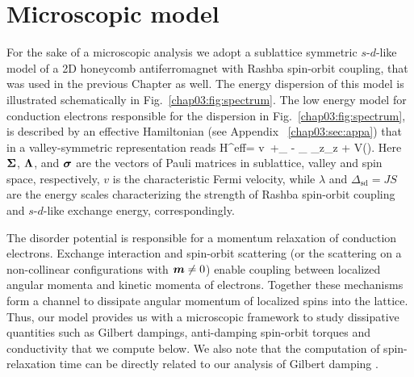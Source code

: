 \section{Microscopic model}

For the sake of a microscopic analysis we adopt a sublattice symmetric $s$-$d$-like model of a 2D honeycomb antiferromagnet with Rashba spin-orbit coupling, that was used in the previous Chapter as well. The energy dispersion of this model is illustrated schematically in Fig.~\ref{chap03:fig:spectrum}.  
The low energy model for conduction electrons responsible for the dispersion in Fig.~\ref{chap03:fig:spectrum}, is described by an effective Hamiltonian (see Appendix ~\ref{chap03:sec:appa}) that in a valley-symmetric representation reads
\be
\label{chap03:eff}
H^\textrm{eff}= v\, \cdot\bb{\Sigma}+\lambda\lt[\bb{\sigma}\times\bb{\Sigma}\rt]_{} - \Delta_{}\,\cdot\bb{\sigma}\,\Sigma_z\Lambda_z + V().
\e
Here $\boldsymbol{\Sigma}$, $\boldsymbol{\Lambda}$, and $\boldsymbol{\sigma}$ are the vectors of Pauli matrices in sublattice, valley and spin space, respectively, $v$ is the characteristic Fermi velocity, while $\lambda$ and $\Delta_{\text{sd}}=JS$ are the energy scales characterizing the strength of Rashba spin-orbit coupling and $s$-$d$-like exchange energy, correspondingly. 


The disorder potential is responsible for a momentum relaxation of conduction electrons. Exchange interaction and spin-orbit scattering (or the scattering on a non-collinear configurations with $\boldsymbol{m}\neq 0$) enable coupling between localized angular momenta and kinetic momenta of electrons. Together these mechanisms form a channel to dissipate angular momentum of localized spins into the lattice. Thus, our model provides us with a microscopic framework to study dissipative quantities such as Gilbert dampings, anti-damping spin-orbit torques and conductivity that we compute below. We also note that the computation of spin-relaxation time can be directly related to our analysis of Gilbert damping \cite{Hankiewicz2007, manchon_spin_2017}. 

